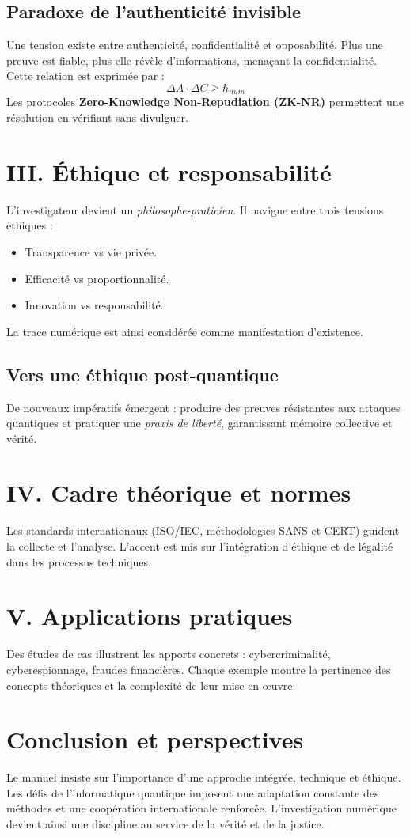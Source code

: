 \documentclass[a4paper,12pt]{article}
\begin{document}
\subsection{Paradoxe de l’authenticité invisible}
Une tension existe entre authenticité, confidentialité et opposabilité. 
Plus une preuve est fiable, plus elle révèle d’informations, menaçant la confidentialité. 
Cette relation est exprimée par :
\[
\Delta A \cdot \Delta C \geq \hbar_{num}
\]
Les protocoles \textbf{Zero-Knowledge Non-Repudiation (ZK-NR)} permettent une résolution 
en vérifiant sans divulguer.

\section{III. Éthique et responsabilité}
L’investigateur devient un \textit{philosophe-praticien}. 
Il navigue entre trois tensions éthiques :
\begin{itemize}
\item Transparence vs vie privée.
\item Efficacité vs proportionnalité.
\item Innovation vs responsabilité.
\end{itemize}
La trace numérique est ainsi considérée comme manifestation d’existence.

\subsection{Vers une éthique post-quantique}
De nouveaux impératifs émergent : produire des preuves résistantes aux attaques quantiques 
et pratiquer une \textit{praxis de liberté}, garantissant mémoire collective et vérité.

\section*{IV. Cadre théorique et normes}
Les standards internationaux (ISO/IEC, méthodologies SANS et CERT) guident la collecte 
et l’analyse. L’accent est mis sur l’intégration d’éthique et de légalité 
dans les processus techniques.

\section*{V. Applications pratiques}
Des études de cas illustrent les apports concrets : cybercriminalité, cyberespionnage, 
fraudes financières. Chaque exemple montre la pertinence des concepts théoriques 
et la complexité de leur mise en œuvre.

\section*{Conclusion et perspectives}
Le manuel insiste sur l’importance d’une approche intégrée, technique et éthique. 
Les défis de l’informatique quantique imposent une adaptation constante des méthodes 
et une coopération internationale renforcée. 
L’investigation numérique devient ainsi une discipline au service de la vérité et de la justice.
\end{document}
